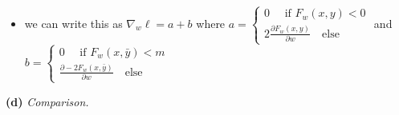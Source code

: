 \documentclass{article}
\begin{document}
\begin{itemize}
    \color{red}
    \item we can write this as $\nabla_{w}\ell = a + b$ where $a = \begin{cases}
        0 \quad \text{ if } F_{w}(x,y)<0\\
        2\frac{\partial F_w(x,y)}{\partial w} \quad \text{else}
    \end{cases}$ and  $b = \begin{cases}
        0 \quad \text{ if } F_{w}(x,\bar{y})<m\\
        \frac{\partial -2F_w(x,\bar{y})}{\partial w} \quad \text{else}
    \end{cases}$
\end{itemize}
\textbf{(d)}
\textit{Comparison.} \\
\end{document}
